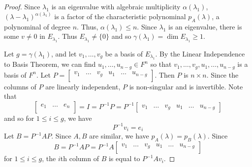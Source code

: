 \documentclass{article}
\begin{document}
    \begin{proof}
      Since $\lambda_1$ is an eigenvalue with algebraic multiplicity $\alpha(\lambda_1)$, $(\lambda-\lambda_1)^{\alpha(\lambda_1)}$ is a factor of the characteristic polynominal $p_A(\lambda)$, a polynominal of degree $n$. Thus, $\alpha(\lambda_1) \leq n$.
      Since $\lambda_1$ is an eigenvalue, there is some $v \neq 0$ in $E_{\lambda_1}$. Thus $E_{\lambda_1} \neq \{0\}$ and so $\gamma(\lambda_1) = \dim E_{\lambda_1} \geq 1$.

      Let $g = \gamma(\lambda_1)$, and let $v_1, \ldots, v_g$ be a basis of $E_{\lambda_1}$. By the Linear Independence to Basis Theorem, we can find $u_1, \ldots, u_{n-g} \in F^n$ so that $v_1, \ldots, v_g, u_1, \ldots, u_{n-g}$ is a basis of $F^n$. Let $P =
      \begin{bmatrix}
        v_1 & \dots & v_g & u_1 & \dots & u_{n-g}\\
      \end{bmatrix}$. Then $P$ is $n \times n$. Since the columns of $P$ are linearly independent, $P$ is non-singular and is invertible. Note that \[
        \begin{bmatrix}
          e_1 & \dots & e_n\\
        \end{bmatrix} = I = P^{-1}P = P^{-1}
        \begin{bmatrix}
          v_1 & \dots & v_g & u_1 & \dots & u_{n-g}
        \end{bmatrix}
      \] and so for $1 \leq i \leq g$, we have \[
        P^{-1}v_i = e_i
      \]
      Let $B = P^{-1}AP$. Since $A, B$ are similar, we have $p_A(\lambda) = p_B(\lambda)$. Since \[
        B = P^{-1}AP = P^{-1}A
        \begin{bmatrix}
          v_1 & \dots & v_g & u_1 & \dots & u_{n-g}\\
        \end{bmatrix}
      \] for $1 \leq i \leq g$, the $i$th column of $B$ is equal to $P^{-1}Av_i$.


\end{proof}
\end{document}
